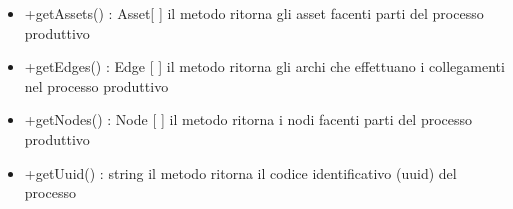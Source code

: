 \begin{itemize}
	\begin{itemize}
		\item +getAssets() : Asset[ ]\newline
		il metodo ritorna gli asset facenti parti del processo produttivo
		\item +getEdges() : Edge [ ]\newline
		il metodo ritorna gli archi che effettuano i collegamenti nel processo produttivo
		\item +getNodes() : Node [ ]\newline
		il metodo ritorna i nodi facenti parti del processo produttivo
		\item +getUuid() : string\newline
		il metodo ritorna il codice identificativo (uuid) del processo
	\end{itemize}
\end{itemize}
